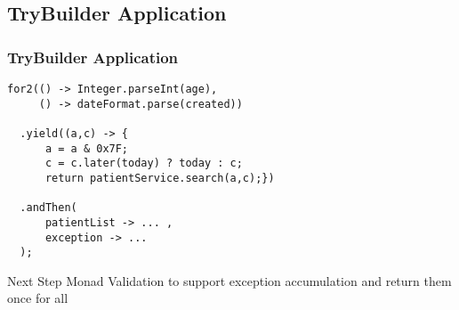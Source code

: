 \documentclass{beamer}
\begin{document}
\subsection{TryBuilder Application}
\begin{frame}[fragile]
  \frametitle{TryBuilder Application}
  \scriptsize{
  \begin{verbatim} 
for2(() -> Integer.parseInt(age), 
     () -> dateFormat.parse(created))
     
  .yield((a,c) -> {
      a = a & 0x7F;
      c = c.later(today) ? today : c;
      return patientService.search(a,c);})
  
  .andThen(
      patientList -> ... ,
      exception -> ...
  );
  \end{verbatim}
  }
  \begin{block}{Next Step}
  \alert{Monad Validation} to support exception accumulation and return them once for all
  \end{block}
\end{frame}
\end{document}
